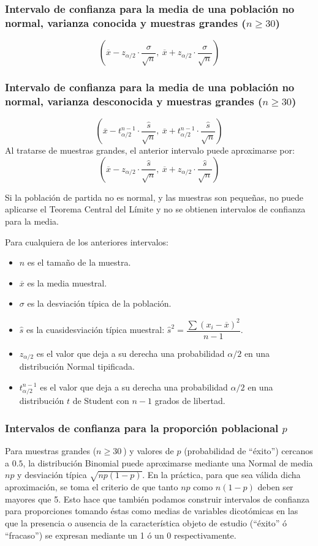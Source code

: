 \subsubsection{Intervalo de confianza para la media de una población no normal, varianza conocida y muestras grandes
($n\geq 30$)}
\[
\left( \overline{x}-z_{\alpha /2}\cdot \dfrac{\sigma }{\sqrt{n}},\ \overline{x}+z_{\alpha /2}\cdot \dfrac{\sigma
}{\sqrt{n}}\right)
\]


\subsubsection{Intervalo de confianza para la media de una población no normal, varianza desconocida y muestras grandes
($n\geq30$)} 
\[ 
\left( \overline{x}-t_{\alpha /2}^{n-1}\cdot \dfrac{\hat s}{\sqrt{n}},\ \overline{x}+t_{\alpha /2}^{n-1}\cdot
\dfrac{\hat s}{\sqrt{n}}\right) 
\]
Al tratarse de muestras grandes, el anterior intervalo puede aproximarse por:
\[
\left( \overline{x}-z_{\alpha /2}\cdot \dfrac{\hat s}{\sqrt{n}},\ \overline{x}+z_{\alpha /2}\cdot
\dfrac{\hat s}{\sqrt{n}}\right)
\]

Si la población de partida no es normal, y las muestras son pequeñas, no puede aplicarse el Teorema Central del Límite y
no se obtienen intervalos de confianza para la media.

Para cualquiera de los anteriores intervalos:
\begin{itemize}[label=--]
\item $n$ es el tamaño de la muestra.
\item $\overline{x}$ es la media muestral.
\item $\sigma $ es la desviación típica de la población.
\item $\hat s$ es la cuasidesviación típica muestral: $\hat s^{2}= \dfrac{\sum \left( x_{i}-\overline{x}\right)
^{2}}{n-1}$. 
\item $z_{\alpha /2}$ es el valor que deja a su derecha una probabilidad $\alpha /2 $ en una distribución Normal
tipificada.
\item $t_{\alpha /2}^{n-1}$ es el valor que deja a su derecha una probabilidad $\alpha/2$ en una distribución $t$ de
Student con $n-1$ grados de libertad.
\end{itemize}


\subsubsection {Intervalos de confianza para la proporción poblacional $p$}
Para muestras grandes ($n\geq30~$) y valores de $p$ (probabilidad de ``éxito'') cercanos a $0.5$, la distribución
Binomial puede aproximarse mediante una Normal de media $np$ y desviación típica $\sqrt {np(1-p)}$. En la práctica, para
que sea válida dicha aproximación, se toma el criterio de que tanto $np$ como $n(1-p)$ deben ser mayores que 5. Esto hace
que también podamos construir intervalos de confianza para proporciones tomando éstas como medias de variables
dicotómicas en las que la presencia o ausencia de la característica objeto de estudio (``éxito'' ó ``fracaso'') se
expresan mediante un 1 ó un 0 respectivamente.

